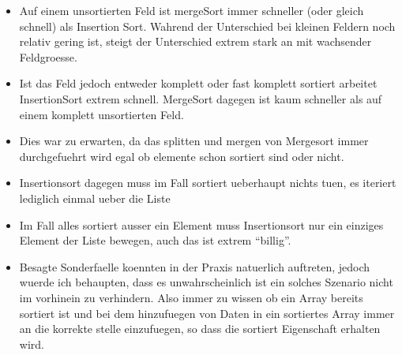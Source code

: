 \documentclass[12pt]{article}
\begin{document}
\newpage
\begin{itemize}
    \item 
        Auf einem unsortierten Feld ist mergeSort immer schneller (oder gleich schnell) als Insertion Sort. Wahrend der Unterschied bei kleinen Feldern noch relativ gering ist, steigt der Unterschied extrem stark an mit wachsender Feldgroesse.
    \item
        Ist das Feld jedoch entweder komplett oder fast komplett sortiert arbeitet InsertionSort extrem schnell. MergeSort dagegen ist kaum schneller als auf einem komplett unsortierten Feld.
    \item
        Dies war zu erwarten, da das splitten und mergen von Mergesort immer durchgefuehrt wird egal ob elemente schon sortiert sind oder nicht.
    \item
        Insertionsort dagegen muss im Fall sortiert ueberhaupt nichts tuen, es iteriert lediglich einmal ueber die Liste
    \item
        Im Fall alles sortiert ausser ein Element muss Insertionsort nur ein einziges Element der Liste bewegen, auch das ist extrem ``billig''.
    \item
        Besagte Sonderfaelle koennten in der Praxis natuerlich auftreten, jedoch wuerde ich behaupten, dass es unwahrscheinlich ist ein solches Szenario nicht im vorhinein zu verhindern. Also immer zu wissen ob ein Array bereits sortiert ist und bei dem hinzufuegen von Daten in ein sortiertes Array immer an die korrekte stelle einzufuegen, so dass die sortiert Eigenschaft erhalten wird.
\end{itemize}



\end{document}
